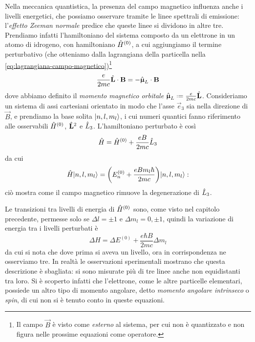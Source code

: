 Nella meccanica quantistica, la presenza del campo magnetico influenza anche i livelli energetici, che possiamo osservare tramite le linee spettrali di emissione: l'\emph{effetto Zeeman normale} predice che queste linee si dividono in altre tre.
Prendiamo infatti l'hamiltoniano del sistema composto da un elettrone in un atomo di idrogeno, con hamiltoniano $\hat{H}^{(0)}$, a cui aggiungiamo il termine perturbativo (che otteniamo dalla lagrangiana della particella nella \eqref{eq:lagrangiana-campo-magnetico})\footnote{
	Il campo $\vec B$ è visto come \emph{esterno} al sistema, per cui non è quantizzato e non figura nelle prossime equazioni come operatore.
}
\begin{equation}
	\frac{e}{2mc}{\hat{\mathbf{L}}}\cdot{\mathbf{B}}=-{\hat{\bm{\upmu}}_L}\cdot{\mathbf{B}}
	\label{eq:perturbazione-zeeman-normale}
\end{equation}
dove abbiamo definito il \emph{momento magnetico orbitale} $\op{\vmu}_L\defeq\frac{e}{2mc}\op{\vec L}$.
Consideriamo un sistema di assi cartesiani orientato in modo che l'asse $\vec e_3$ sia nella direzione di $\vec B$, e prendiamo la base solita $\lvert n,l,m_l\rangle$, i cui numeri quantici fanno riferimento alle osservabili $\hat{H}^{(0)}$, $\hat{\mathbf{L}}^2$ e $\hat{L}_3$.
L'hamiltoniano perturbato è cos\`i
\begin{equation}
	\hat{H}=\hat{H}^{(0)}+\frac{eB}{2mc}\hat{L}_3
\end{equation}
da cui
\begin{equation}
	\hat{H}\lvert n,l,m_l\rangle=\bigg(E^{(0)}_n+\frac{eBm_l\hbar}{2mc}\bigg)\lvert n,l,m_l\rangle:
\end{equation}
ciò mostra come il campo magnetico rimuove la degenerazione di $\hat{L}_3$.

Le transizioni tra livelli di energia di $\hat{H}^{(0)}$ sono, come visto nel capitolo precedente, permesse solo se $\Delta l=\pm 1$ e $\Delta m_l=0,\pm 1$, quindi la variazione di energia tra i livelli perturbati è
\begin{equation}
	\Delta H=\Delta E^{(0)}+\frac{e\hbar B}{2mc}\Delta m_l
\end{equation}
da cui si nota che dove prima si aveva un livello, ora in corrispondenza ne osserviamo tre.
In realtà le osservazioni sperimentali mostrano che questa descrizione è sbagliata: si sono misurate più di tre linee anche non equidistanti tra loro.
Si è scoperto infatti che l'elettrone, come le altre particelle elementari, possiede un altro tipo di momento angolare, detto \emph{momento angolare intrinseco} o \emph{spin}, di cui non si è tenuto conto in queste equazioni.
